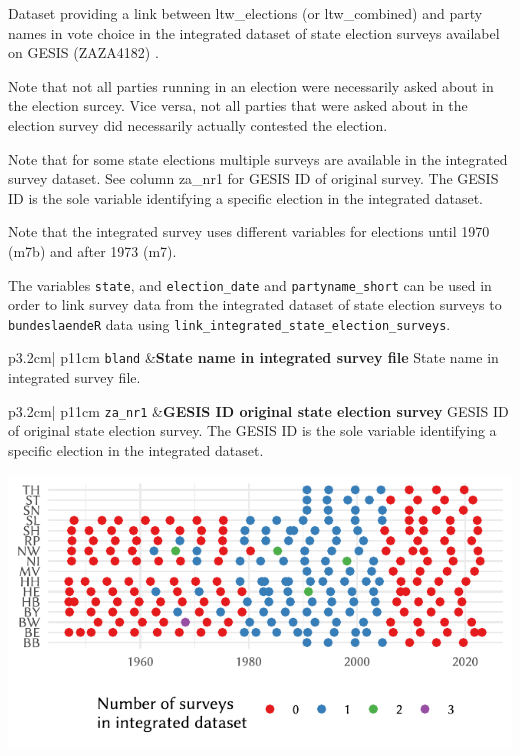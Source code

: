 \documentclass[
]{scrartcl}
\begin{document}
Dataset providing a link between ltw\_elections (or ltw\_combined) and
party names in vote choice in the integrated dataset of state election
surveys availabel on GESIS (ZAZA4182)
\parencite{scheuchGermanFederalState2015}.

Note that not all parties running in an election were necessarily asked
about in the election surcey. Vice versa, not all parties that were
asked about in the election survey did necessarily actually contested
the election.

Note that for some state elections multiple surveys are available in the
integrated survey dataset. See column za\_nr1 for GESIS ID of original
survey. The GESIS ID is the sole variable identifying a specific
election in the integrated dataset.

Note that the integrated survey uses different variables for elections
until 1970 (m7b) and after 1973 (m7).

The variables \texttt{state}, and \texttt{election\_date} and
\texttt{partyname\_short} can be used in order to link survey data from
the integrated dataset of state election surveys to
\texttt{bundeslaendeR} data using
\texttt{link\_integrated\_state\_election\_surveys}.

\begin{longtable}{p{3.2cm}| p{11cm}}
\texttt{bland} &\textbf{State name in integrated survey file}\newline 
State name in integrated survey file.
\end{longtable}

\begin{longtable}{p{3.2cm}| p{11cm}}
\texttt{za\_nr1} &\textbf{GESIS ID original state election survey}\newline 
GESIS ID of original state election survey. The GESIS ID is the sole variable identifying a specific election in the integrated dataset.







\hspace*{.25cm}
\begin{minipage}[t]{\linewidth }
\vspace{0pt}
\includegraphics[width = \linewidth]{cbfiles/plot_surveys.pdf}
\end{minipage}



\end{longtable}
\end{document}
